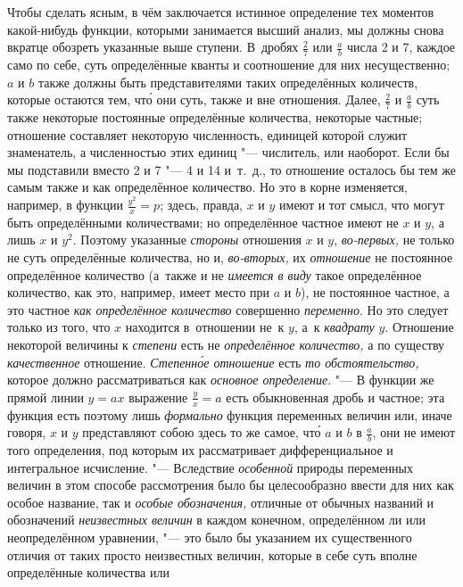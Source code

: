Чтобы сделать ясным, в чём заключается истинное определение тех моментов
какой-нибудь функции, которыми занимается высший анализ, мы должны снова
вкратце обозреть указанные выше ступени. В~дробях $\frac 2 7$ или $\frac a b$
числа 2 и 7, каждое само по себе, суть определённые кванты и соотношение
для них несущественно; $a$ и $b$ также должны быть представителями таких
определённых количеств, которые остаются тем, чт\'{о} они суть, также и вне
отношения. Далее, $\frac 2 7$ и $\frac a b$ суть также некоторые постоянные
определённые количества, некоторые частные; отношение составляет некоторую
численность, единицей которой служит знаменатель, а численностью этих единиц
"--- числитель, или наоборот. Если бы мы подставили вместо 2 и 7 "--- 4 и 14
и~т.~д., то отношение осталось бы тем же самым также и как определённое
количество. Но это в корне изменяется, например, в функции
$\frac{y^2}x=p$; здесь, правда, $x$ и $y$ имеют и тот смысл, что могут
быть определёнными количествами; но
определённое частное имеют не $x$ и $y$, а лишь $x$ и $y^2$. Поэтому
указанные {\em стороны} отношения $x$ и $y$,
{\em во-первых,} не только не суть
определённые количества, но и, {\em во-вторых,} их
{\em отношение} не постоянное определённое количество (а~также и
не {\em имеется в виду} такое определённое количество, как это, например,
имеет место при $a$ и $b$),
не постоянное частное, а это частное {\em как определённое количество}
совершенно {\em переменно}. Но это следует только из того, что $x$ находится
в~отношении не~к $y$, а~к {\em квадрату} $y$. Отношение некоторой величины
к {\em степени} есть не {\em определённое количество,} а по существу
{\em качественное} отношение. {\em Степенн\'{о}е отношение} есть
{\em то обстоятельство,} которое должно рассматриваться как
{\em основное определение}. "--- В функции же прямой линии $y=ax$ выражение
$\frac y x=a$ есть обыкновенная
дробь и частное; эта функция есть поэтому лишь {\em формально} функция
переменных величин или, иначе говоря, $x$ и $y$ представляют собою здесь то же
самое, чт\'{о} $a$ и $b$ в $\frac a b$, они не имеют того определения, под которым
их рассматривает дифференциальное и интегральное исчисление. "--- Вследствие
{\em особенной} природы переменных величин в этом способе рассмотрения было бы
целесообразно ввести для них как особое название, так и
{\em особые обозначения,} отличные от обычных названий и обозначений
{\em неизвестных величин} в каждом конечном, определённом ли или неопределённом
уравнении, "--- это было бы указанием их существенного отличия от таких просто
неизвестных величин, которые в себе суть вполне определённые количества или

